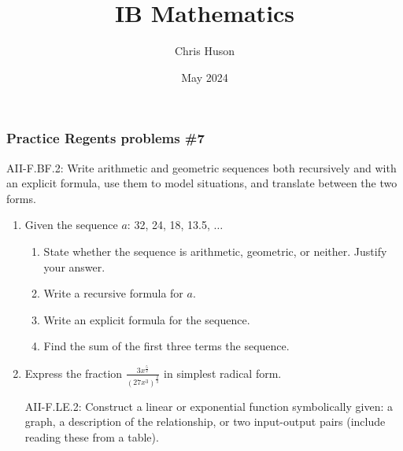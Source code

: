 \documentclass[12pt, twoside]{article}
\title{IB Mathematics}
\author{Chris Huson}
\date{May 2024}
\begin{document}
\subsubsection*{Practice Regents problems \#7}
AII-F.BF.2: Write arithmetic and geometric sequences both recursively and with an explicit formula, use them to model situations, and translate between the two forms.

\begin{enumerate}
\item Given the sequence $a$: 32, 24, 18, 13.5, $\ldots$
\begin{enumerate}[itemsep=4cm]
    \item State whether the sequence is arithmetic, geometric, or neither. Justify your answer.
    \item Write a recursive formula for $a$.
    \item Write an explicit formula for the sequence.
    \item Find the sum of the first three terms the sequence.
\end{enumerate}

\item Express the fraction $\displaystyle \frac{3x^{\frac{5}{2}}}{(27x^3)^{\frac{2}{3}}}$ in simplest radical form. \vspace{3cm}

\newpage
AII-F.LE.2: Construct a linear or exponential function symbolically given: a graph, a description of the relationship, or two input-output pairs (include reading these from a table).


\end{enumerate}
\end{document}
